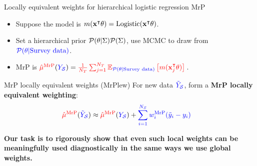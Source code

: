 \begin{frame}[t]{Locally equivalent weights for hierarchical logistic regression MrP}
%
\vspace{-1em}
\begin{itemize}
    \item Suppose the model is $\m(\x^\trans \theta) = \mathrm{Logistic}(\x^\trans \theta)$.
    \item Set a hierarchical prior $\p(\theta \vert \Sigma)\p(\Sigma)$,
            use MCMC to draw from $\post$.
    \item MrP is $\muhatmrp = \tarcol{\meantar \expect{\post}{\m(\x_j^\trans \theta)}}$.
\end{itemize}
%
\vspace{2em}
    \begin{block}{MrP locally equivalent weights (MrPlew)}
    \centering
    \vspace{1em}
    For new data $\Ytil$, form a \textbf{MrP locally equivalent weighting}:
    $$
    \begin{aligned}
    \muhatmrp[\Ytil] \approx{}& \muhatmrp + \surcol{\sumsur \w_i^\mrp (\ytil_i - \y_i)}
    \end{aligned}
    $$
    \vspace{1em}
    \end{block}

\vspace{2em}
    \textbf{
        Our task is to rigorously show that even such local weights can be meaningfully
        used diagnostically in the same ways we use global weights.
     }

\end{frame}

